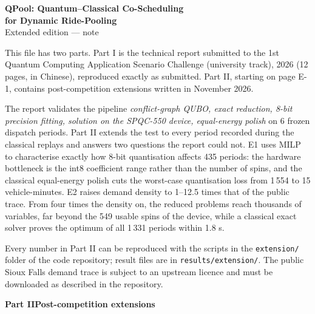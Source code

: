 
\graphicspath{{../../figures/extension/}}

\thispagestyle{empty}
\begin{center}
{\Large\bfseries QPool: Quantum--Classical Co-Scheduling\\[0.2em] for Dynamic Ride-Pooling}\\[0.7em]
{\large Extended edition --- note}
\end{center}
\vspace{0.8em}

This file has two parts. Part I is the technical report submitted to the 1st Quantum Computing Application Scenario Challenge (university track), 2026 (12 pages, in Chinese), reproduced exactly as submitted. Part II, starting on page E-1, contains post-competition extensions written in November 2026.

The report validates the pipeline \emph{conflict-graph QUBO, exact reduction, 8-bit precision fitting, solution on the SPQC-550 device, equal-energy polish} on 6 frozen dispatch periods. Part II extends the test to every period recorded during the classical replays and answers two questions the report could not. E1 uses MILP to characterise exactly how 8-bit quantisation affects 435 periods: the hardware bottleneck is the int8 coefficient range rather than the number of spins, and the classical equal-energy polish cuts the worst-case quantisation loss from 1\,554 to 15 vehicle-minutes. E2 raises demand density to 1--12.5 times that of the public trace. From four times the density on, the reduced problems reach thousands of variables, far beyond the 549 usable spins of the device, while a classical exact solver proves the optimum of all 1\,331 periods within 1.8 s.

Every number in Part II can be reproduced with the scripts in the \texttt{extension/} folder of the code repository; result files are in \texttt{results/extension/}. The public Sioux Falls demand trace is subject to an upstream licence and must be downloaded as described in the repository.

\clearpage
{}

\setcounter{page}{1}
\begin{center}{\Large\bfseries Part II\quad Post-competition extensions}\end{center}

